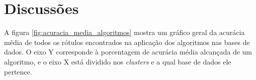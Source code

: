 



\section{Discussões}


A figura \ref{fig:acuracia_media_algoritmos} mostra um gráfico geral da acurácia média de todos os rótulos encontrados na aplicação dos algoritmos nas bases de dados. O eixo Y corresponde à porcentagem de acurácia média alcançada de um algoritmo, e o eixo X está dividido nos \textit{clusters} e a qual base de dados ele pertence. 

